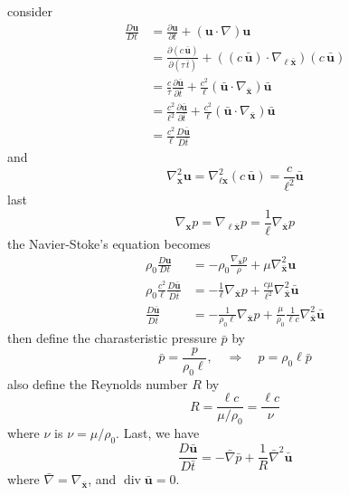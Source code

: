 consider
\begin{equation}
\begin{aligned}
\frac{D\textbf{u}}{Dt}
&= \frac{\partial \textbf{u}}{\partial t} + \left(\textbf{u}\cdot\nabla\right)\textbf{u}\\
&= \frac{\partial (c\,\bar{\textbf{u}})}{\partial (\tau\,\bar{t})} + \left((c\,\bar{\textbf{u}})\cdot\nabla_{\ell\bar{\textbf{x}}}\right)(c\,\bar{\textbf{u}})\\
&= \frac{c}{\tau}\frac{\partial \bar{\textbf{u}}}{\partial \bar{t}} + \frac{c^2}{\ell}\left(\bar{\textbf{u}}\cdot\nabla_{\bar{\textbf{x}}}\right)\bar{\textbf{u}}\\
&= \frac{c^2}{\ell^2}\frac{\partial \bar{\textbf{u}}}{\partial \bar{t}} + \frac{c^2}{\ell}\left(\bar{\textbf{u}}\cdot\nabla_{\bar{\textbf{x}}}\right)\bar{\textbf{u}}\\
&= \frac{c^2}{\ell} \frac{D\bar{\textbf{u}}}{D\bar{t}}
\end{aligned}
\end{equation}
and
\begin{equation}
\nabla_{\textbf{x}}^2 \textbf{u} =\nabla_{\ell\textbf{x}}^2 (c\,\bar{\textbf{u}}) = \frac{c}{\ell^2} \bar{\textbf{u}}
\end{equation}
last 
\begin{equation}
\nabla_{\textbf{x}} p = \nabla_{\ell\bar{\textbf{x}}} p =\frac{1}{\ell} \nabla_{\bar{\textbf{x}}}p
\end{equation}
the Navier-Stoke's equation becomes
\begin{equation}
\begin{aligned}
\rho_0\frac{D\textbf{u}}{Dt}
&= - \rho_0\frac{\nabla_{\bar{\textbf{x}}} p}{\rho} + \mu\nabla_{\bar{\textbf{x}}}^2\textbf{u}\\
\rho_0\frac{c^2}{\ell}\frac{D\bar{\textbf{u}}}{D\bar{t}}
&= - \frac{1}{\ell}\nabla_{\bar{\textbf{x}}}p + \frac{c\mu}{\ell^2}\nabla_{\bar{\textbf{x}}}^2\bar{\textbf{u}}\\
\frac{D\bar{\textbf{u}}}{D\bar{t}}
&= -\frac{1}{\rho_0\ell} \nabla_{\bar{\textbf{x}}} p + \frac{\mu}{\rho_0}\frac{1}{\ell c}\nabla_{\bar{\textbf{x}}}^2\bar{\textbf{u}}
\end{aligned}
\end{equation}
then define the charasteristic pressure $\bar{p}$ by
\begin{equation}
\bar{p} = \frac{p}{\rho_0\ell},\quad \Rightarrow\quad
p = \rho_0\ell \bar{p}
\end{equation}
also define the Reynolds number $R$ by
\begin{equation}
R = \frac{\ell c}{\mu/\rho_0} = \frac{\ell c}{\nu}
\end{equation}
where $\nu$ is $\nu = \mu/\rho_0$. Last, we have
\begin{equation}
\frac{D\bar{\textbf{u}}}{D\bar{t}}
= - \bar{\nabla} \bar{p} + \frac{1}{R}\bar{\nabla}^2\bar{\textbf{u}}
\end{equation}
where $\bar{\nabla} = \nabla_{\bar{\textbf{x}}}$, and $\operatorname{div}\bar{\textbf{u}} = 0$.

